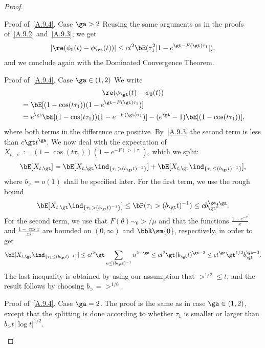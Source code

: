 \begin{proof}
\begin{step}{Proof of~\eqref{A.9.4}. Case $\ga >2$}
Reusing the same arguments as in the proofs of~\eqref{A.9.2} and~\eqref{A.9.3}, we get
\begin{equation}
| \re(\phi_0(t) -\phi_\gt(t)) | \le ct^2 \bE(\tau_1^2|1-e^{\gt - F(\gt)\tau_1}|),
\end{equation}
and we conclude again with the Dominated Convergence Theorem.
\end{step}

\begin{step}{Proof of~\eqref{A.9.4}. Case $\ga \in (1,2)$}
We write
\begin{multline}
\re (\phi_\gt(t) - \phi_0(t))\\
\begin{aligned}
&= \bE[(1-\cos(t\tau_1)) (1-e^{\gt -F(\gt)\tau_1})]\\
& = e^{\gt}\bE[(1-\cos(t\tau_1)) (1-e^{-F(\gt)\tau_1})] - (e^\gt - 1)\bE[(1-\cos(t\tau_1))],
\end{aligned}
\end{multline}
where both terms in the difference are positive. By~\eqref{A.9.3} the second term is less than $c\gt t^\ga$. We now deal with the expectation of $X_{t,\gt} := (1-\cos(t\tau_1)) (1-e^{-F(\gt)\tau_1})$, which we split:
\begin{equation}
\bE[X_{t,\gt}] = \bE[X_{t,\gt} \ind_{\{\tau_1 > (b_\gt t)^{-1}\}}] + \bE[X_{t,\gt} \ind_{\{\tau_1 \le (b_\gt t)^{-1}\}}],
\end{equation}
where $b_\gt = o(1)$ shall be specified later. For the first term, we use the rough bound
\begin{equation}
\bE[X_{t,\gt} \ind_{\{\tau_1 > (b_\gt t)^{-1}\}}] \le \bP(\tau_1 > (b_\gt t)^{-1}) \le c b_\gt^\ga t^\ga.
\end{equation}
For the second term, we use that $F(\theta)\sim_0 \gt/\mu$ and that the functions $\frac{1-e^{-x}}{x}$ and $\frac{1-\cos x}{x^2}$ are bounded on $(0,\infty)$ and $\bbR\sm\{0\}$, respectively, in order to get
\begin{equation}
\bE[X_{t,\gt} \ind_{\{\tau_1\le (b_\gt t)^{-1}\}}]
\le c t^2 \gt \sum_{n\le (b_\gt t)^{-1}} n^{2-\ga}
\le ct^2\gt (b_\gt t)^{\ga - 3} \le c t^\ga \gt^{1/2}b_\gt^{\ga-3}.
\end{equation}
The last inequality is obtained by using our assumption that $\gt^{1/2} \le t$, and the result follows by choosing $b_\gt = \gt^{1/6}$.
\end{step}

\begin{laststep}{Proof of~\eqref{A.9.4}. Case $\ga =2$.} The proof is the same as in case $\ga \in(1,2)$, except that the splitting is done according to whether $\tau_1$ is smaller or larger than $b_\gt t |{\log t}|^{1/2}$.
\end{laststep}
\let\qed\relax
\end{proof}

